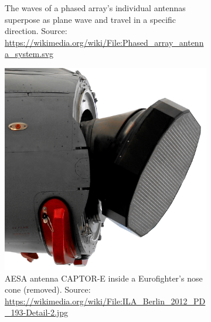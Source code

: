 \begin{figure}[htbp]
    \centering
    \begin{subfigure}[t]{0.3\textwidth}
        \def\svgwidth{\linewidth} \footnotesize
        
        \caption{The waves of a phased array's individual antennas superpose as plane wave and travel in a specific direction. Source: \url{https://wikimedia.org/wiki/File:Phased_array_antenna_system.svg}}
        \label{fig:phased}
    \end{subfigure}
    \hfill
    \begin{subfigure}[t]{0.3\textwidth}
        \includegraphics[max width=\linewidth]{gfx/pictures/ILA_Berlin_2012_PD_193-Detail-2}
        \caption{AESA antenna CAPTOR-E inside a Eurofighter's nose cone (removed). Source: \url{https://wikimedia.org/wiki/File:ILA_Berlin_2012_PD_193-Detail-2.jpg}}
        \label{fig:aesa}
    \end{subfigure}
    \hfill
    \begin{subfigure}[t]{0.3\textwidth}

\end{subfigure}
\end{figure}
